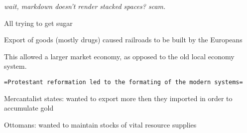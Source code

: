 \documentclass[letterpaper]{article}
\begin{document}
\emph{wait, markdown doesn't render stacked spaces? scam.}

All trying to get sugar

Export of goods (mostly drugs) caused railroads to be built by the
Europeans

This allowed a larger market economy, as opposed to the old local
economy system.

\texttt{=Protestant reformation led to the formating of the modern systems=}

Mercantalist states: wanted to export more then they imported in order
to accumulate gold

Ottomans: wanted to maintain stocks of vital resource supplies
\end{document}
